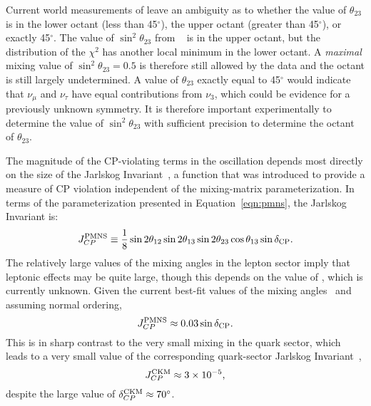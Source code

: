 Current world measurements of  leave an ambiguity as to whether the value of $\theta_{23}$ is in the lower octant (less than 45\mbox{$^{\circ}$}), the upper octant (greater than 45\mbox{$^{\circ}$}), or exactly 45\mbox{$^{\circ}$}.  The value of $\sin^2 \theta_{23}$ from ~\cite{Esteban:2018azc,nufitweb} is in the upper octant, but the distribution of the $\chi^{2}$ has another local minimum in the lower octant. A \emph{maximal} mixing value of $\sin^2 \theta_{23} =0.5$ is therefore still allowed by the data and the octant is still largely undetermined.  A value of
$\theta_{23}$ exactly equal to 45\mbox{$^{\circ}$} would indicate that $\nu_{\mu}$ and $\nu_{\tau}$ have equal contributions from $\nu_3$, which could be evidence for a previously unknown symmetry.  It is therefore important experimentally to determine the value of $\sin ^2
\theta_{23}$ with sufficient precision to determine the octant of $\theta_{23}$.

The magnitude of the
CP-violating terms in the oscillation depends most directly on the
size of the Jarlskog Invariant~\cite{Jarlskog:1985cw}, a function that
was introduced to provide a measure of CP violation independent of the
mixing-matrix parameterization. In terms of the parameterization
presented in Equation~\ref{eqn:pmns}, the Jarlskog Invariant is:
%
\begin{equation}
J_{CP}^{\rm PMNS} \equiv \frac{1}{8} \sin 2 \theta_{12} \sin 2 \theta_{13}
\sin 2 \theta_{23} \cos \theta_{13} \sin \delta_{\rm CP}.
\end{equation}
The relatively large values of the mixing angles in the lepton sector imply that
leptonic  effects may be quite large, though this depends on
the value of \deltacp, which is currently unknown. Given the current best-fit values of the mixing angles~\cite{Esteban:2018azc,nufitweb} and assuming normal ordering,
\begin{equation}
J_{CP}^{\rm PMNS} \approx 0.03 \sin \delta_{\rm CP}.
\end{equation}
This is in sharp contrast to the very small mixing in the quark sector,  
which leads to a very small value of the corresponding quark-sector
Jarlskog Invariant~\cite{Tanabashi:2018oca}, %
\begin{equation}
J_{CP}^{\rm CKM} \approx 3 \times 10^{-5},
\end{equation}
despite the large value of $\delta^{\rm CKM}_{CP}\approx70^{\circ}$.

